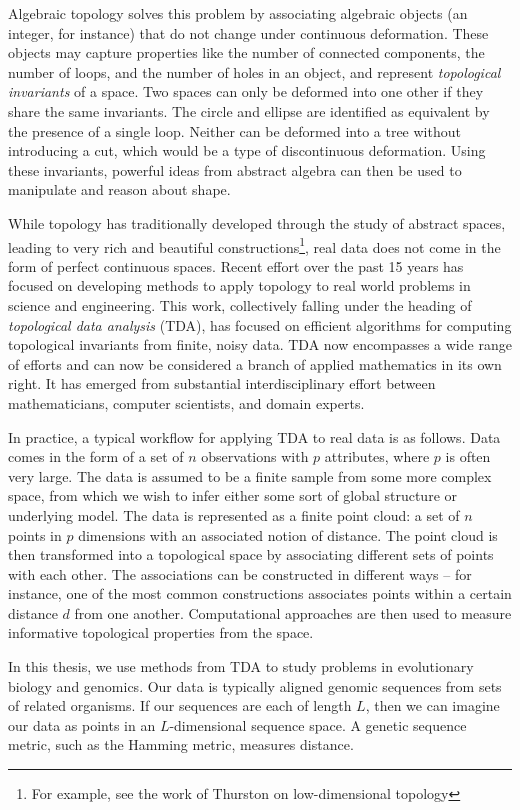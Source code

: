 Algebraic topology solves this problem by associating algebraic objects (an integer, for instance) that do not change under continuous deformation.
These objects may capture properties like the number of connected components, the number of loops, and the number of holes in an object, and represent \emph{topological invariants} of a space.
Two spaces can only be deformed into one other if they share the same invariants.
The circle and ellipse are identified as equivalent by the presence of a single loop.
Neither can be deformed into a tree without introducing a cut, which would be a type of discontinuous deformation.
Using these invariants, powerful ideas from abstract algebra can then be used to manipulate and reason about shape.

While topology has traditionally developed through the study of abstract spaces, leading to very rich and beautiful constructions\footnote{For example, see the work of Thurston on low-dimensional topology}, real data does not come in the form of perfect continuous spaces.
Recent effort over the past 15 years has focused on developing methods to apply topology to real world problems in science and engineering.
This work, collectively falling under the heading of \emph{topological data analysis} (TDA), has focused on efficient algorithms for computing topological invariants from finite, noisy data.
TDA now encompasses a wide range of efforts and can now be considered a branch of applied mathematics in its own right.
It has emerged from substantial interdisciplinary effort between mathematicians, computer scientists, and domain experts.

In practice, a typical workflow for applying TDA to real data is as follows.
Data comes in the form of a set of $n$ observations with $p$ attributes, where $p$ is often very large.
The data is assumed to be a finite sample from some more complex space, from which we wish to infer either some sort of global structure or underlying model.
The data is represented as a finite point cloud: a set of $n$ points in $p$ dimensions with an associated notion of distance.
The point cloud is then transformed into a topological space by associating different sets of points with each other.
The associations can be constructed in different ways -- for instance, one of the most common constructions associates points within a certain distance $d$ from one another.
Computational approaches are then used to measure informative topological properties from the space.

In this thesis, we use methods from TDA to study problems in evolutionary biology and genomics.
Our data is typically aligned genomic sequences from sets of related organisms.
If our sequences are each of length $L$, then we can imagine our data as points in an $L$-dimensional sequence space.
A genetic sequence metric, such as the Hamming metric, measures distance.

